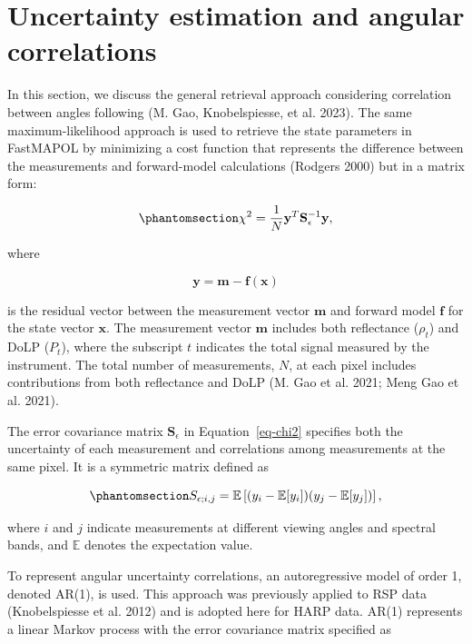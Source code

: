 \documentclass[
  11pt,
  letterpaper,
  DIV=11,
  numbers=noendperiod]{scrreprt}
\begin{document}
\chapter{Uncertainty estimation and angular
correlations}\label{uncertainty-estimation-and-angular-correlations}

In this section, we discuss the general retrieval approach considering
correlation between angles following (M. Gao, Knobelspiesse, et al.
2023). The same maximum-likelihood approach is used to retrieve the
state parameters in FastMAPOL by minimizing a cost function that
represents the difference between the measurements and forward-model
calculations (Rodgers 2000) but in a matrix form:

\begin{equation}\phantomsection\label{eq-chi2}{
\chi^2
=
\frac{1}{N}
\mathbf{y}^{T}
\mathbf{S}_{\epsilon}^{-1}
\mathbf{y},
}\end{equation}

where

\[
\mathbf{y}
=
\mathbf{m}
-
\mathbf{f}(\mathbf{x})
\]

is the residual vector between the measurement vector \(\mathbf{m}\) and
forward model \(\mathbf{f}\) for the state vector \(\mathbf{x}\). The
measurement vector \(\mathbf{m}\) includes both reflectance (\(\rho_t\))
and DoLP (\(P_t\)), where the subscript \(t\) indicates the total signal
measured by the instrument. The total number of measurements, \(N\), at
each pixel includes contributions from both reflectance and DoLP (M. Gao
et al. 2021; Meng Gao et al. 2021).

The error covariance matrix \(\mathbf{S}_{\epsilon}\) in
Equation~\ref{eq-chi2} specifies both the uncertainty of each
measurement and correlations among measurements at the same pixel. It is
a symmetric matrix defined as

\begin{equation}\phantomsection\label{eq-covariance-definition}{
S_{\epsilon;i,j}
=
\mathbb{E}
\left[
(y_i-\mathbb{E}[y_i])
(y_j-\mathbb{E}[y_j])
\right],
}\end{equation}

where \(i\) and \(j\) indicate measurements at different viewing angles
and spectral bands, and \(\mathbb{E}\) denotes the expectation value.

To represent angular uncertainty correlations, an autoregressive model
of order 1, denoted AR(1), is used. This approach was previously applied
to RSP data (Knobelspiesse et al. 2012) and is adopted here for HARP
data. AR(1) represents a linear Markov process with the error covariance
matrix specified as
\end{document}
